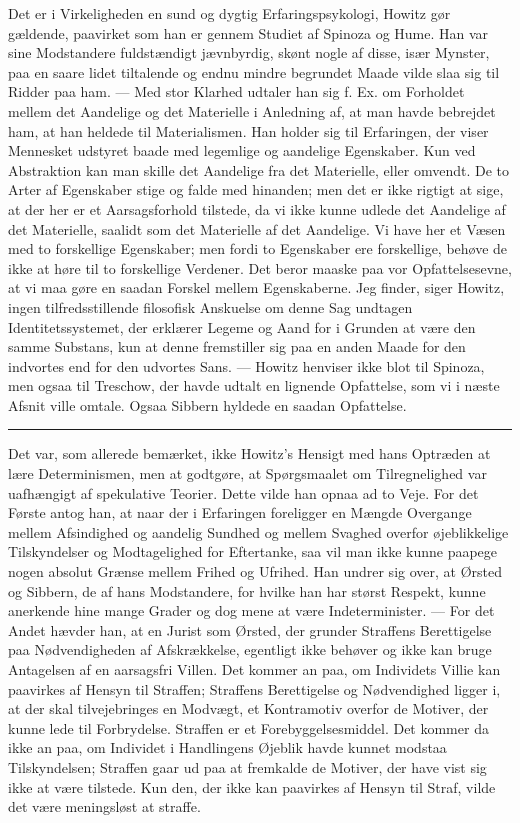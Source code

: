 \documentclass[12pt,a4paper,openany]{book}
\newcommand{\opage}[1]{\marginnote{\footnotesize\textit{[#1]}}}
\begin{document}
Det er i Virkeligheden en sund og dygtig Erfaringspsykologi, Howitz gør
gældende, paavirket som han er gennem Studiet af Spinoza og Hume. Han var sine
Modstandere fuldstændigt jævnbyrdig, skønt nogle af disse, især Mynster, paa en
saare lidet tiltalende og endnu mindre begrundet Maade vilde slaa sig til
Ridder paa ham. --- Med stor Klarhed udtaler han sig f. Ex. om Forholdet mellem
det Aandelige og det Materielle i Anledning af, at man havde bebrejdet ham, at
han heldede til Materialismen. Han holder sig til Erfaringen, der viser
Mennesket udstyret baade med legemlige og aandelige Egenskaber. Kun ved
Abstraktion kan man skille det Aandelige fra det Materielle, eller omvendt. De
to Arter af Egenskaber stige og falde med hinanden; men det er ikke rigtigt at
sige, at der her er et Aarsagsforhold tilstede, da vi ikke kunne udlede det
Aandelige af det Materielle, saalidt som det Materielle af det Aandelige. Vi
have her et Væsen med to forskellige Egenskaber; men fordi to Egenskaber ere
forskellige, behøve de ikke at høre til to forskellige Verdener. Det
\setcounter{footnote}{0}%
\opage{86}beror maaske paa vor Opfattelsesevne, at vi maa gøre en saadan
Forskel mellem Egenskaberne. Jeg finder, siger Howitz, ingen tilfredsstillende
filosofisk Anskuelse om denne Sag undtagen Identitetssystemet, der erklærer
Legeme og Aand for i Grunden at være den samme Substans, kun at denne
fremstiller sig paa en anden Maade for den indvortes end for den udvortes Sans.
--- Howitz henviser ikke blot til Spinoza, men ogsaa til Treschow, der havde
udtalt en lignende Opfattelse, som vi i næste Afsnit ville omtale. Ogsaa
Sibbern hyldede en saadan Opfattelse.

\begin{center}\rule{2cm}{0.4pt}\end{center}

Det var, som allerede bemærket, ikke Howitz's Hensigt med hans Optræden at lære
Determinismen, men at godtgøre, at Spørgsmaalet om Tilregnelighed var
uafhængigt af spekulative Teorier. Dette vilde han opnaa ad to Veje. For det
Første antog han, at naar der i Erfaringen foreligger en Mængde Overgange
mellem Afsindighed og aandelig Sundhed og mellem Svaghed overfor øjeblikkelige
Tilskyndelser og Modtagelighed for Eftertanke, saa vil man ikke kunne paapege
nogen absolut Grænse mellem Frihed og Ufrihed. Han undrer sig over, at Ørsted
og Sibbern, de af hans Modstandere, for hvilke han har størst Respekt, kunne
anerkende hine mange Grader og dog mene at være Indeterminister. --- For det
Andet hævder han, at en Jurist som Ørsted, der grunder Straffens Berettigelse
paa Nødvendigheden af Afskrækkelse, egentligt ikke behøver og ikke kan bruge
Antagelsen af en aarsagsfri Villen. Det kommer an paa, om Individets Villie kan
paavirkes af Hensyn til Straffen; Straffens Berettigelse og Nødvendighed ligger
i, at der skal tilvejebringes en Modvægt, et Kontramotiv overfor de Motiver,
der kunne lede til Forbrydelse. Straffen er et Forebyggelsesmiddel. Det kommer
da ikke an paa, om Individet i Handlingens Øjeblik havde kunnet modstaa
Tilskyndelsen; Straffen gaar ud paa at fremkalde de Motiver, der have vist sig
ikke at være tilstede.
\setcounter{footnote}{0}%
\opage{87}Kun den, der ikke kan paavirkes af Hensyn til Straf, vilde det være
meningsløst at straffe.
\end{document}
